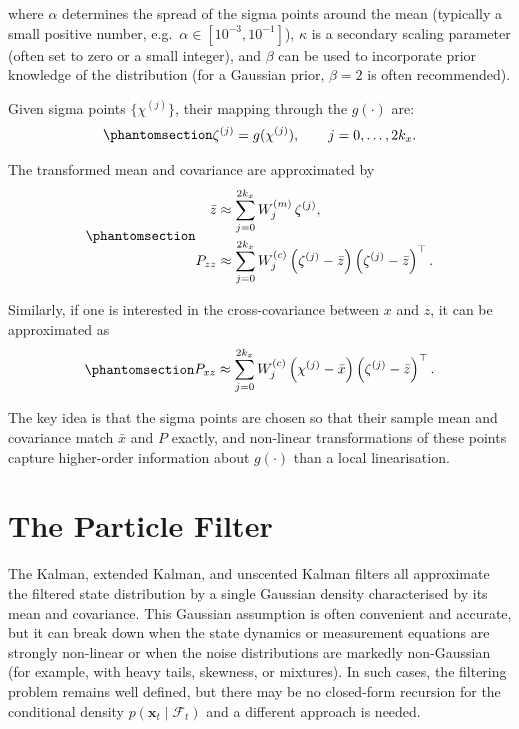 \documentclass[
  letterpaper,
  DIV=11,
  numbers=noendperiod]{scrreprt}
\begin{document}
where \(\alpha\) determines the spread of the sigma points around the
mean (typically a small positive number,
e.g.~\(\alpha \in [10^{-3}, 10^{-1}]\)), \(\kappa\) is a secondary
scaling parameter (often set to zero or a small integer), and \(\beta\)
can be used to incorporate prior knowledge of the distribution (for a
Gaussian prior, \(\beta = 2\) is often recommended).

Given sigma points \(\{\chi^{(j)}\}\), their mapping through the
\(g(\cdot)\) are:
\begin{equation}\protect\phantomsection\label{eq-gen-0140}{
\begin{align}
    \zeta^{(j)} = g(\chi^{(j)}), \qquad j = 0, \ldots, 2 k_x.
\end{align}
}\end{equation}

The transformed mean and covariance are approximated by
\begin{equation}\protect\phantomsection\label{eq-gen-0141}{
\begin{align}
    \bar{z} &\approx \sum_{j=0}^{2 k_x} W^{(m)}_j \, \zeta^{(j)}, \\
    P_{zz} &\approx \sum_{j=0}^{2 k_x} W^{(c)}_j \left(\zeta^{(j)} - \bar{z}\right)\left(\zeta^{(j)} - \bar{z}\right)^{\top}. 
\end{align}
}\end{equation}

Similarly, if one is interested in the cross-covariance between \(x\)
and \(z\), it can be approximated as
\begin{equation}\protect\phantomsection\label{eq-gen-0142}{
\begin{align}
    P_{xz} \approx \sum_{j=0}^{2 k_x} W^{(c)}_j \left(\chi^{(j)} - \bar{x}\right)\left(\zeta^{(j)} - \bar{z}\right)^{\top}. 
\end{align}
}\end{equation}

The key idea is that the sigma points are chosen so that their sample
mean and covariance match \(\bar{x}\) and \(P\) exactly, and non-linear
transformations of these points capture higher-order information about
\(g(\cdot)\) than a local linearisation.

\section{The Particle Filter}\label{the-particle-filter}

The Kalman, extended Kalman, and unscented Kalman filters all
approximate the filtered state distribution by a single Gaussian density
characterised by its mean and covariance. This Gaussian assumption is
often convenient and accurate, but it can break down when the state
dynamics or measurement equations are strongly non-linear or when the
noise distributions are markedly non-Gaussian (for example, with heavy
tails, skewness, or mixtures). In such cases, the filtering problem
remains well defined, but there may be no closed-form recursion for the
conditional density \(p(\mathbf{x}_t \mid \mathcal{F}_t)\) and a
different approach is needed.
\end{document}
